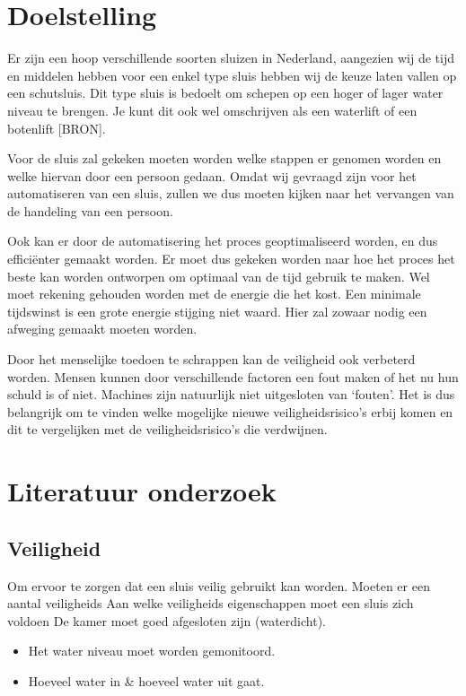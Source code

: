 \documentclass{article}
\begin{document}
\clearpage %
\section{Doelstelling}
Er zijn een hoop verschillende soorten sluizen in Nederland, aangezien wij de tijd en middelen hebben voor een enkel type sluis hebben wij de keuze laten vallen op een schutsluis. Dit type sluis is bedoelt om schepen op een hoger of lager water niveau te brengen. Je kunt dit ook wel omschrijven als een waterlift of een botenlift [BRON].

Voor de sluis zal gekeken moeten worden welke stappen er genomen worden en welke hiervan door een persoon gedaan. Omdat wij gevraagd zijn voor het automatiseren van een sluis, zullen we dus moeten kijken naar het vervangen van de handeling van een persoon.

Ook kan er door de automatisering het proces geoptimaliseerd worden, en dus efficiënter gemaakt worden. Er moet dus gekeken worden naar hoe het proces het beste kan worden ontworpen om optimaal van de tijd gebruik te maken. Wel moet rekening gehouden worden met de energie die het kost. Een minimale tijdswinst is een grote energie stijging niet waard. Hier zal zowaar nodig een afweging gemaakt moeten worden.

Door het menselijke toedoen te schrappen kan de veiligheid ook verbeterd worden. Mensen kunnen door verschillende factoren een fout maken of het nu hun schuld is of niet. Machines zijn natuurlijk niet uitgesloten van ‘fouten’. Het is dus belangrijk om te vinden welke mogelijke nieuwe veiligheidsrisico’s erbij komen en dit te vergelijken met de veiligheidsrisico’s die verdwijnen.


\clearpage %
\section{Literatuur onderzoek} %

\subsection{Veiligheid}
Om ervoor te zorgen dat een sluis veilig gebruikt kan worden. Moeten er een aantal veiligheids 
Aan welke veiligheids eigenschappen moet een sluis zich voldoen
De kamer moet goed afgesloten zijn (waterdicht).
\begin{itemize}
\item Het water niveau moet worden gemonitoord.
\item Hoeveel water in \& hoeveel water uit gaat.
\end{itemize}
\end{document}
